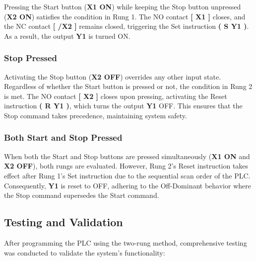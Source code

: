 \documentclass[12pt]{article}
\begin{document}
Pressing the Start button (\textbf{X1 ON}) while keeping the Stop button unpressed (\textbf{X2 ON}) satisfies the condition in Rung 1. The NO contact \textbf{[ X1 ]} closes, and the NC contact \textbf{[ /X2 ]} remains closed, triggering the Set instruction \textbf{( S Y1 )}. As a result, the output \textbf{Y1} is turned ON.

\subsubsection{Stop Pressed}

Activating the Stop button (\textbf{X2 OFF}) overrides any other input state. Regardless of whether the Start button is pressed or not, the condition in Rung 2 is met. The NO contact \textbf{[ X2 ]} closes upon pressing, activating the Reset instruction \textbf{( R Y1 )}, which turns the output \textbf{Y1} OFF. This ensures that the Stop command takes precedence, maintaining system safety.

\subsubsection{Both Start and Stop Pressed}

When both the Start and Stop buttons are pressed simultaneously (\textbf{X1 ON} and \textbf{X2 OFF}), both rungs are evaluated. However, Rung 2's Reset instruction takes effect after Rung 1's Set instruction due to the sequential scan order of the PLC. Consequently, \textbf{Y1} is reset to OFF, adhering to the Off-Dominant behavior where the Stop command supersedes the Start command.

\subsection{Testing and Validation}

After programming the PLC using the two-rung method, comprehensive testing was conducted to validate the system's functionality:
\end{document}
